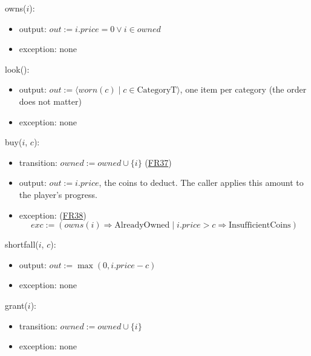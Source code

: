 \documentclass[10pt, titlepage]{article}
\newcommand{\srsurl}{https://team-hindsight.github.io/ophthamology-game/SRS/SRS.pdf}
\newcommand{\srsitemref}[2]{\href{\srsurl\#nameddest=#1}{#2}}
\newcommand{\T}[1]{\mathit{#1}}          %
\newcommand{\out}{\mathit{out}}
\newcommand{\exc}{\mathit{exc}}
\begin{document}
\begin{samepage}
\noindent owns($i$):
\begin{itemize}
\item output: $\out := i.\T{price} = 0 \vee i \in \T{owned}$
\item exception: none
\end{itemize}
\end{samepage}
\par\pagebreak[0]

\begin{samepage}
\noindent look():
\begin{itemize}
\item output: $\out := \langle \T{worn}(c) \mid c \in \text{CategoryT}\rangle$,
  one item per category (the order does not matter)
\item exception: none
\end{itemize}
\end{samepage}
\par\pagebreak[0]

\begin{samepage}
\noindent buy($i$, $c$):
\begin{itemize}
\item transition: $\T{owned} := \T{owned} \cup \{i\}$ (\srsitemref{FR_Purchase}{FR37})
\item output: $\out := i.\T{price}$, the coins to deduct. The caller
  applies this amount to the player's progress.
\item exception: (\srsitemref{FR_PurchaseRefused}{FR38})
  \[\exc := (\T{owns}(i) \Rightarrow \text{AlreadyOwned} \mid i.\T{price} >
  c \Rightarrow \text{InsufficientCoins})\]
\end{itemize}
\end{samepage}
\par\pagebreak[0]

\begin{samepage}
\noindent shortfall($i$, $c$):
\begin{itemize}
\item output: $\out := \max(0, i.\T{price} - c)$
\item exception: none
\end{itemize}
\end{samepage}
\par\pagebreak[0]

\begin{samepage}
\noindent grant($i$):
\begin{itemize}
\item transition: $\T{owned} := \T{owned} \cup \{i\}$
\item exception: none
\end{itemize}
\end{samepage}
\par\pagebreak[0]
\end{document}

